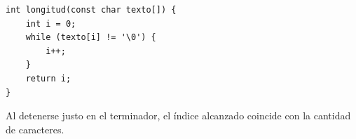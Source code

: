 \begin{enumerate}[label=\textbf{\arabic*.}]
\ifpauta\begin{solucionbox}\begin{lstlisting}[style=customc]
int longitud(const char texto[]) {
    int i = 0;
    while (texto[i] != '\0') {
        i++;
    }
    return i;
}
\end{lstlisting}Al detenerse justo en el terminador, el índice alcanzado coincide con la cantidad de caracteres.\end{solucionbox}\else\vspace{3cm}\fi
\end{enumerate}

